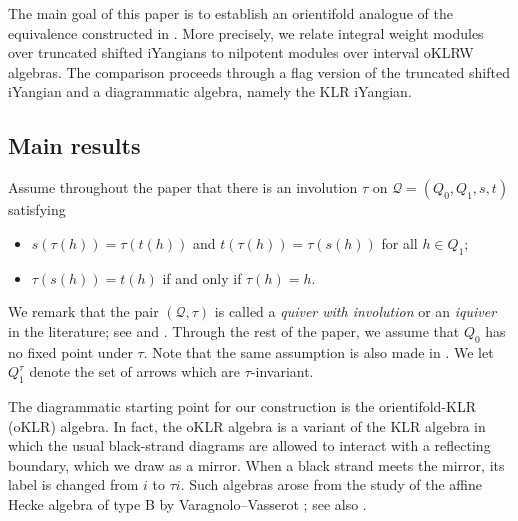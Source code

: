 \documentclass[12pt,openany]{amsart}
\newcommand{\Qui}{\mathcal{Q}}
\begin{document}
The main goal of this paper is to establish an orientifold analogue of the equivalence constructed in \cite{KTWWY19}. More precisely, we relate integral weight modules over
truncated shifted iYangians to nilpotent modules over interval
oKLRW algebras. The comparison proceeds through a flag version of the
truncated shifted iYangian and a diagrammatic algebra, namely the
KLR iYangian.



\subsection{Main results}
\label{sec:qwi}
Assume throughout the paper that there is an involution $\tau$ on $\Qui=(Q_0,Q_1,s,t)$ satisfying
\begin{itemize}
    \item 
    $s(\tau(h))=\tau(t(h))$ and $ t(\tau(h))=\tau(s(h))$ for all $h \in Q_1$; 
    \item $\tau(s(h))=t(h)$ if and only if $\tau(h)=h$. 
\end{itemize}
We remark that the pair $(\Qui,\tau)$ is called a \emph{quiver with involution} or an \emph{iquiver} in the literature; see \cite{EK07} and \cite{VV11}. Through the rest of the paper, we assume that $Q_0$ has no fixed point under $\tau$. Note that the same assumption is also made in \cite{En09,VV11,SSX25}. We let $Q_1^{\tau}$ denote the set of arrows which are $\tau$-invariant.

The diagrammatic starting point for our construction is the orientifold-KLR (oKLR) algebra. In fact, the oKLR algebra is a variant of the KLR algebra in which the usual black-strand diagrams are allowed to interact with a reflecting boundary, which we draw as a mirror. When a black strand meets the mirror, its label is changed from $i$ to \(\tau i\). Such algebras arose from the study of the affine Hecke algebra of type B by Varagnolo--Vasserot \cite{VV11}; see also \cite{Prz23}.
\end{document}
